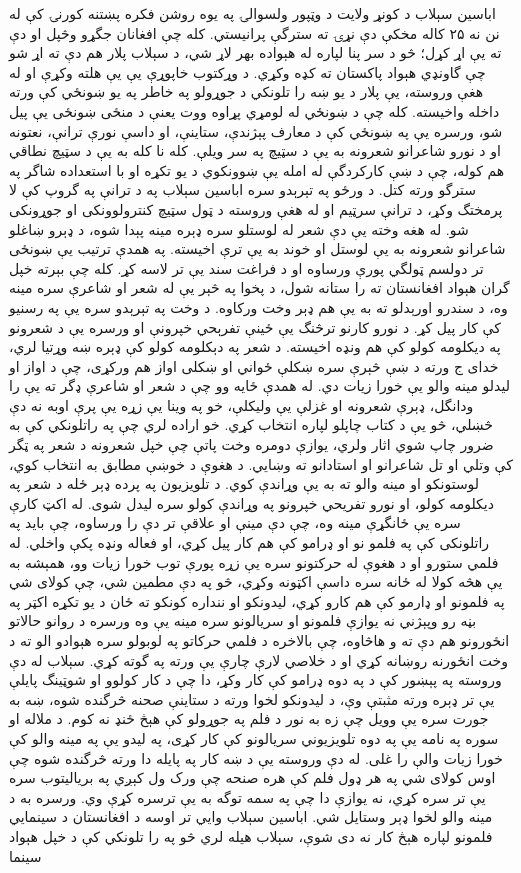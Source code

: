 \documentclass[a4paper]{article}
\begin{document}
\begin{flushright}
اباسین سېلاب د کونړ ولایت د وټپور ولسوالۍ په یوه روشن فکره پښتنه کورنۍ کې له نن نه ۲۵ کاله مخکې دې نړۍ ته سترگې پرانیستي. کله چې افغانان جگړو وڅپل او دې ته یې اړ کړل؛ څو د سر پنا لپاره له هېواده بهر لاړ شي، د سېلاب پلار هم دې ته اړ شو چې گاونډي هېواد پاکستان ته کډه وکړي. د وړکتوب خاپوړې یې یې هلته وکړې او له هغې وروسته، یې پلار د یو ښه را تلونکي د جوړولو په خاطر په یو ښونځي کې ورته داخله واخیسته. کله چې د ښونځي له لومړي پړاوه ووت یعنې د منځی ښونځی یې پیل شو، ورسره یې په ښونځي کې د معارف پېژندې، ستاینې، او داسې نورې ترانې، نعتونه او د نورو شاعرانو شعرونه به یې د سټیچ په سر ویلې. کله نا کله به یې د سټیچ نطاقي هم کوله، چې د ښې کارکردگې له امله یې ښوونکوي د یو تکړه او با استعداده شاگر په سترگو ورته کتل. د ورځو په تېرېدو سره اباسین سېلاب په د ترانې په گروپ کې لا پرمختگ وکړ، د ترانې سرټیم او له هغې وروسته د ټول سټیچ کنترولوونکی او جوړونکی شو. له هغه وخته یې دې شعر له لوستلو سره ډېره مینه پېدا شوه، د ډېرو ښاغلو شاعرانو شعرونه به یې لوستل او خوند به یې ترې اخیسته. په همدې ترتیب یې ښونځی تر دولسم ټولگي پورې ورساوه او د فراغت سند یې تر لاسه کړ. کله چې بېرته خپل گران هېواد افغانستان ته را ستانه شول، د پخوا په څېر یې له شعر او شاعرې سره مینه وه، د سندرو اورېدلو ته به یې هم ډېر وخت ورکاوه. د وخت په تېرېدو سره یې په رسنیو کې کار پیل کړ. د نورو کارنو ترڅنگ یې ځینې تفرېحي خپرونې او ورسره یې د شعرونو په دیکلومه کولو کې هم ونډه اخیسته. د شعر په دېکلومه کولو کې ډېره ښه وړتیا لري، خدای ج ورته د ښې څېرې سره ښکلې ځواني او ښکلی اواز هم ورکړی، چې د اواز او لیدلو مینه والو یې خورا زیات دي. له همدې ځایه وو چې د شعر او شاعرې ډگر ته یې را ودانگل، ډېرې شعرونه او غزلې یې ولیکلې، خو په وینا یې زړه یې پرې اوبه نه دې څښلي، څو یې د کتاب چاپلو لپاره انتخاب کړي. خو اراده لري چې په راتلونکي کې به ضرور چاپ شوي اثار ولري، یوازې دومره وخت پاتې چې خپل شعرونه د شعر په ټگر کې وتلي او تل شاعرانو او استادانو ته وښایي. د هغوې د خوښې مطابق به انتخاب کوي، لوستونکو او مینه والو ته به یې وړاندې کوي. د تلویزیون په پرده ډېر ځله د شعر په دیکلومه کولو، او نورو تفریحي خپرونو په وړاندې کولو سره لیدل شوی. له اکټ کارې سره یې ځانگړې مینه وه، چې دې مینې او علاقې تر دې را ورساوه، چې باید په راتلونکی کې په فلمو نو او ډرامو کې هم کار پیل کړي، او فعاله ونډه پکې واخلي. له فلمي ستورو او د هغوې له حرکتونو سره یې زړه پورې توب خورا زیات وو، همېشه به یې هڅه کولا له ځانه سره داسې اکټونه وکړي، څو په دې مطمین شي، چې کولای شي په فلمونو او ډارمو کې هم کارو کړي، لیدونکو او ننداره کونکو ته ځان د یو تکړه اکټر په بڼه رو وپېژني نه یوازې فلمونو او سریالونو سره مینه یې وه ورسره د روانو حالاتو انځورونو هم دې ته و هاڅاوه، چې بالاخره د فلمي حرکاتو په لوبولو سره هېوادو الو ته د وخت انځورنه روښانه کړي او د خلاصي لارې چارې یې ورته په گوته کړي. سېلاب له دې وروسته په پېښور کې د په دوه ډرامو کې کار وکړ، دا چې د کار کولوو او شوټینگ پایلې یې تر ډېره ورته مثبتې وې، د لیدونکو لخوا ورته د ستاینې صحنه څرگنده شوه، ښه به جورت سره یې وویل چې زه به نور د فلم په جوړولو کې هېڅ ځنډ نه کوم. د ملاله او سوره په نامه یې په دوه تلویزیوني سریالونو کې کار کړی، په لیدو یې په مینه والو کې خورا زیات والې را غلی. له دې وروسته یې د ښه کار په پایله دا ورته څرگنده شوه چې اوس کولای شي په هر ډول فلم کې هره صنحه چې ورک ول کېږي په بریالیتوب سره یې تر سره کړي، نه یوازې دا چې په سمه توگه به یې ترسره کړې وي. ورسره به د مینه والو لخوا ډېر وستایل شي. اباسین سېلاب وايي تر اوسه د افغانستان د سینمایي فلمونو لپاره هېڅ کار نه دی شوې، سېلاب هیله لري څو په را تلونکي کې د خپل هېواد سینما 
\end{flushright}
\end{document}
